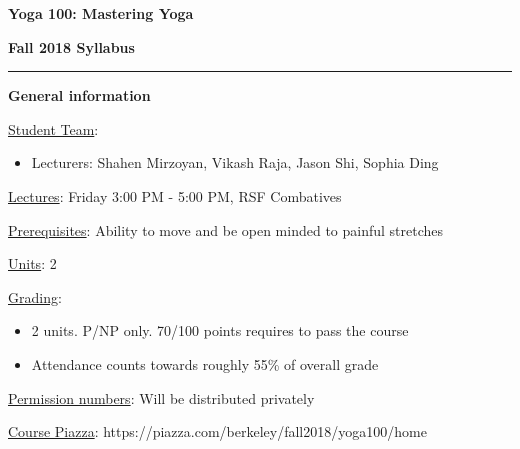 \documentclass{article}
\begin{document}
\begin{center}

\huge


\textbf{Yoga 100: Mastering Yoga}

\textbf{Fall 2018 Syllabus}


\end{center}

\noindent\rule[0.5ex]{\linewidth}{1pt}


\Large

\begin{flushleft}
\textbf{General information}

\vspace{0.5cm}

\large

\underline{Student Team}:
\begin{itemize}[noitemsep,nolistsep]
    \item Lecturers: Shahen Mirzoyan, Vikash Raja, Jason Shi, Sophia Ding
\end{itemize}

\vspace{0.1cm}

\underline{Lectures}: Friday 3:00 PM - 5:00 PM, RSF Combatives

\vspace{0.1cm}

\underline{Prerequisites}: Ability to move and be open minded to painful stretches

\vspace{0.1cm}

\underline{Units}: 2

\vspace{0.1cm}

\underline{Grading}:
\vspace{0.1cm}
\begin{itemize}[noitemsep,nolistsep]
    \item 2 units. P/NP only. 70/100 points requires to pass the course
    \item Attendance counts towards roughly 55\% of overall grade
\end{itemize}


\vspace{0.1cm}

\underline{Permission numbers}: Will be distributed privately

\vspace{0.1cm}

\underline{Course Piazza}: https://piazza.com/berkeley/fall2018/yoga100/home


\end{flushleft}
\end{document}
